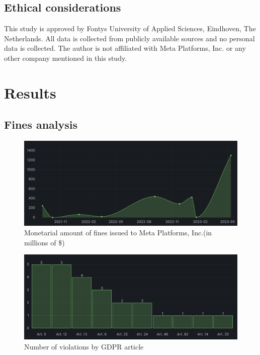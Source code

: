 \documentclass[12pt, a4paper]{article}
\begin{document}
\subsection*{Ethical considerations}

This study is approved by Fontys University of Applied Sciences, Eindhoven, The
Netherlands. All data is collected from publicly available sources and no
personal data is collected. The author is not affiliated with Meta Platforms,
Inc. or any other company mentioned in this study.

\section*{Results}

\subsection*{Fines analysis}



\begin{figure}[h]
    \centering
    \includegraphics[width=1.00\textwidth]{monetarial-amount-of-gdpr-fines}
    \caption{Monetarial amount of fines issued to Meta Platforms, Inc.(in millions of \$)}
    \label{fig:amount-of-gdpr-fines}
\end{figure}

\begin{figure}[h]
    \centering
    \includegraphics[width=1.00\textwidth]{violations-by-article}
    \caption{Number of violations by GDPR article}
    \label{fig:violations-by-article}
\end{figure}
\end{document}
